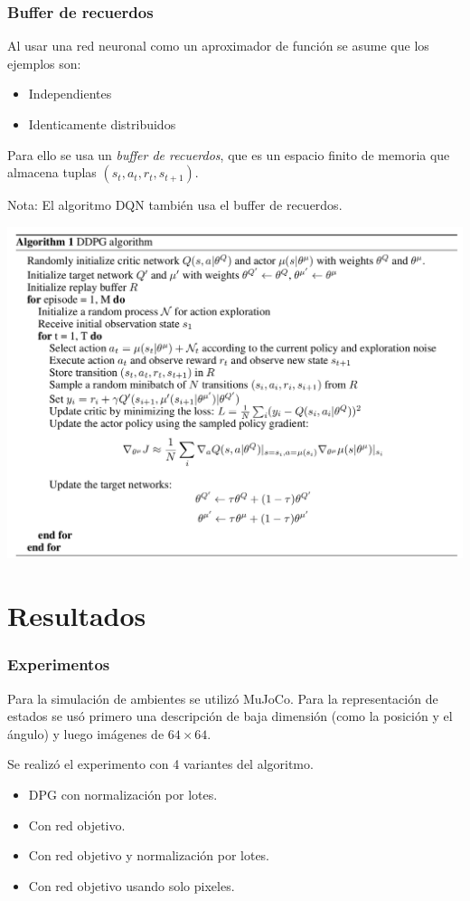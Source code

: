 \documentclass[
    11pt,
    aspectratio=169,
]{beamer}
\begin{document}
\begin{frame}
\frametitle{Buffer de recuerdos}

Al usar una red neuronal como un aproximador de función se asume que los ejemplos son:

\begin{itemize}
\item Independientes
\item Identicamente distribuidos
\end{itemize}

Para ello se usa un \textit{buffer de recuerdos}, que es un espacio finito de memoria que almacena tuplas $(s_t, a_t, r_t, s_{t+1})$.

Nota: El algoritmo DQN también usa el buffer de recuerdos.

\end{frame}

\begin{frame}
\includegraphics[scale=0.2]{Images/ddpg}
\end{frame}

\section{Resultados}

\begin{frame}
\frametitle{Experimentos}

Para la simulación de ambientes se utilizó MuJoCo. Para la representación de estados se usó primero una descripción de baja dimensión (como la posición y el ángulo) y luego imágenes de $64 \times 64$.

Se realizó el experimento con 4 variantes del algoritmo.

\begin{itemize}
\item DPG con normalización por lotes.
\item Con red objetivo.
\item Con red objetivo y normalización por lotes.
\item Con red objetivo usando solo pixeles.
\end{itemize}

\end{frame}
\end{document}
